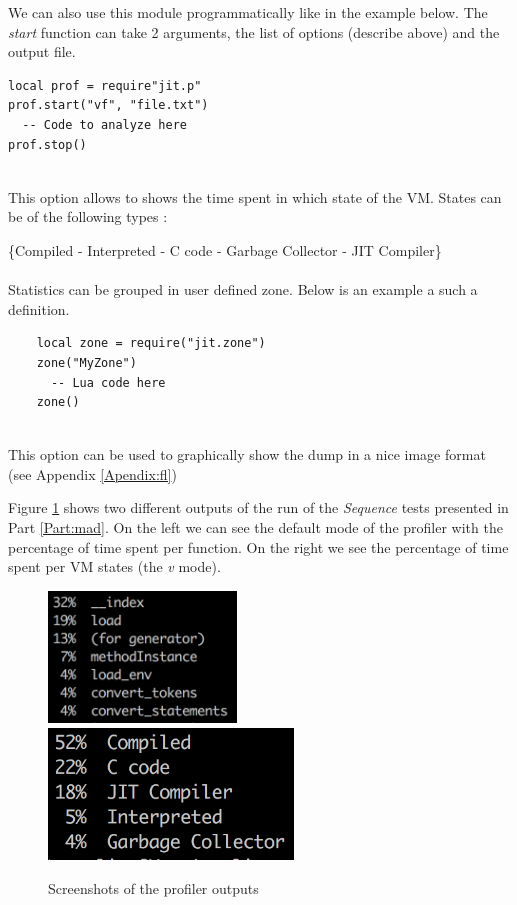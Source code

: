 We can also use this module programmatically like in the example below. The
\emph{start} function can take 2 arguments, the list of options (describe above)
and the output file.
\begin{lstlisting}[style=LuaStyle]
local prof = require"jit.p"
prof.start("vf", "file.txt")
  -- Code to analyze here
prof.stop()
\end{lstlisting}

\\
This option allows to shows the time spent in which state of the VM.
States can be of the following types :

\{Compiled - Interpreted - C code - Garbage Collector - JIT Compiler\} \\

\\
Statistics can be grouped in user defined zone. Below is an example a such a
definition.
\begin{lstlisting}
    local zone = require("jit.zone")
    zone("MyZone")
      -- Lua code here
    zone()
\end{lstlisting}

\\
This option can be used to graphically show the dump in a nice image format
(see Appendix \ref{Apendix:fl})

Figure \ref{fig:profiler} shows two different outputs of the run of the
\emph{Sequence} tests presented in Part \ref{Part:mad}. On the left we can see
the default mode of the profiler with the percentage of time spent per function.
On the right we see the percentage of time spent per VM states (the \emph{v} mode).

\begin{figure}[H]
    \centering
    \includegraphics[height=3.5cm]{./Images/profiler-1}
    \includegraphics[height=3.5cm]{./Images/profiler-2}
    \caption{Screenshots of the profiler outputs}
    \label{fig:profiler}
\end{figure}
